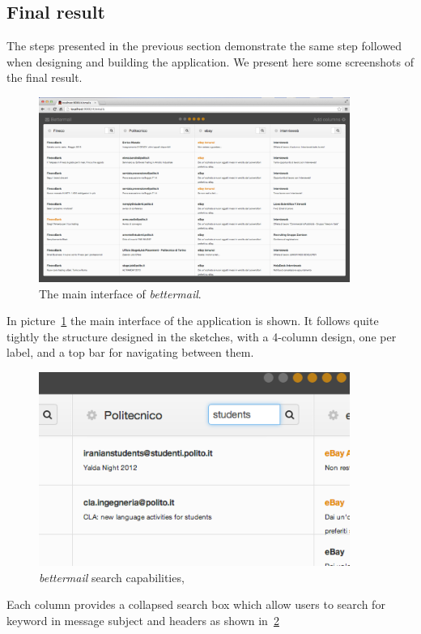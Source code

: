 \documentclass[a4paper,12pt]{report}
\begin{document}
\subsection{Final result}

The steps presented in the previous section demonstrate the same step followed when designing and building the application. We present here some screenshots of the final result.

\begin{figure}[H]
  \centering
  \includegraphics[width=4in]{main}
  \caption{The main interface of \emph{bettermail}.}
  \label{fig:main}
\end{figure}
In picture~\ref{fig:main} the main interface of the application is shown. It follows quite tightly the structure designed in the sketches, with a 4-column design, one per label, and a top bar for navigating between them.

\begin{figure}[H]
  \centering
  \includegraphics[width=4in]{main_search}
  \caption{\emph{bettermail} search capabilities,}
  \label{fig:main_search}
\end{figure}
Each column provides a collapsed search box which allow users to search for keyword in message subject and headers as shown in~\ref{fig:main_search}
\end{document}
